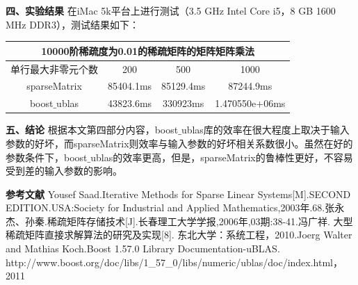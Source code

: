 \documentclass{article}
\begin{document}
\textbf{四、实验结果}
      \qquad
\newline
在iMac 5k平台上进行测试（3.5 GHz Intel Core i5，8 GB 1600 MHz DDR3），测试结果如下：

\begin{tabular}{|c|c|c|c|}
\hline \multicolumn{4}{|c|}{10000阶稀疏度为0.01的稀疏矩阵的矩阵矩阵乘法}\\
\hline 单行最大非零元个数&200&500&1000\\
\hline sparseMatrix&85404.1ms&85129.4ms&87244.9ms\\
\hline boost$\_$ublas&43823.6ms&330923ms&1.470550e+06ms\\
\hline
\end{tabular}

\textbf{五、结论}
      \qquad
\newline
	根据本文第四部分内容，boost$\_$ublas库的效率在很大程度上取决于输入参数的好坏，而sparseMatrix则效率与输入参数的好坏相关系数很小。虽然在好的参数条件下，boost$\_$ublas的效率更高，但是，sparseMatrix的鲁棒性更好，不容易受到差的输入参数的影响。



\textbf{参考文献}
      \qquad
\newline
 [1]Yousef Saad.Iterative Methods for Sparse Linear Systems[M].SECOND EDITION.USA:Society for Industrial and Applied Mathematics,2003年.68.\newline
 [2]张永杰、孙秦.稀疏矩阵存储技术[J].长春理工大学学报,2006年,03期:38-41.\newline
 [3]冯广祥. 大型稀疏矩阵直接求解算法的研究及实现[8].  东北大学：系统工程，2010.\newline
 [4]Joerg Walter and Mathias Koch.Boost 1.57.0 Library Documentation-uBLAS. http://www.boost.org/doc/libs/1\_57\_0/libs/numeric/ublas/doc/index.html， 2011\newline

  
\end{document}
